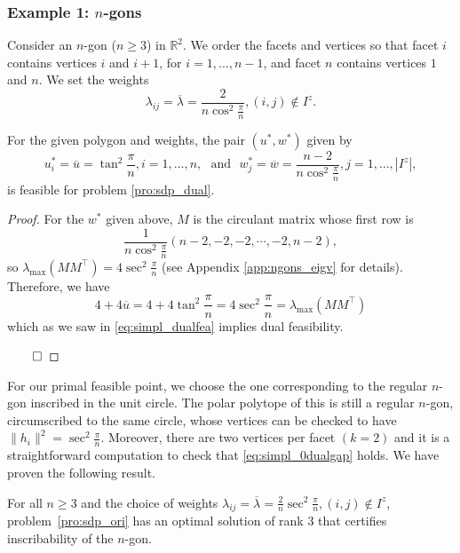 \documentclass[smallextended, envcountsame]{svjour3}
\begin{document}
\subsubsection{Example 1: $n$-gons}\label{subsubsec:ngons}
    Consider an $n$-gon ($n\ge 3$) in $\mathbb{R}^2$.  We order the facets and vertices so that facet $i$ contains vertices $i$ and $i+1$, for $i=1,...,n-1$, and facet $n$ contains vertices $1$ and $n$.
    We set the weights 
    \begin{equation*}
        \lambda_{ij} = \overline{\lambda} = \frac{2}{n\cos^2\frac{\pi}{n}}, (i,j)\notin I^z.
    \end{equation*}
    
    \begin{lemma}
        For the given polygon and weights, the pair $(u^*,w^*)$ given by
            \begin{equation*}
    		u_i^* = \overline{u}= \tan^2\frac{\pi}{n}, i=1,\ldots,n,~~~\text{and}~~~w_j^* = \overline{w}=\frac{n-2}{n\cos^2\frac{\pi}{n}}, j=1,\ldots,\left|I^z\right|,
    	\end{equation*}
        is feasible for problem \eqref{pro:sdp_dual}.
    \end{lemma}
    \begin{proof}
        For the $w^*$ given above, $M$ is the circulant matrix whose first row is
        $$\frac{1}{n\cos^2\frac{\pi}{n}}\left(n-2, -2, -2, \cdots , -2, n-2 \right),$$
        so $\lambda_{\max}(MM^\top)=4\sec^2\frac{\pi}{n}$ (see Appendix \ref{app:ngons_eigv} for details). Therefore, we have
        $$4+4\overline{u}= 4+4\tan^2\frac{\pi}{n} = 4\sec^2\frac{\pi}{n} = \lambda_{\max}(MM^\top)  $$
        which as we saw in \eqref{eq:simpl_dualfea} implies dual feasibility.

    $\hfill\qed$
    \end{proof}

    For our primal feasible point, we choose the one corresponding to the regular $n$-gon inscribed in the unit circle. The polar polytope of this is still a regular $n$-gon, circumscribed to the same circle, whose vertices can be checked to have $\|h_i\|^2=\sec^2\frac{\pi}{n}$. Moreover, there are two vertices per facet $(k=2)$ and it is a straightforward computation to check that \eqref{eq:simpl_0dualgap} holds.  We have proven the following result.
    \begin{theorem}
        For all $n \ge 3$ and the choice of weights $\lambda_{ij} = \overline{\lambda} = \frac{2}{n}\sec^2\frac{\pi}{n}, (i,j)\notin I^z$, problem~\eqref{pro:sdp_ori} has an optimal solution of rank $3$ that certifies inscribability of the $n$-gon.
    \end{theorem}
\end{document}
